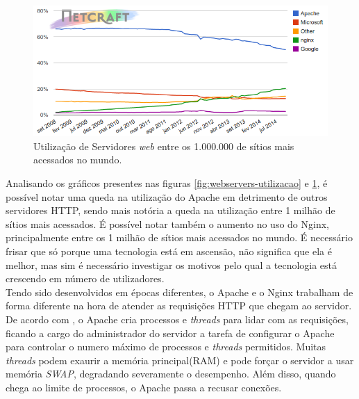 \begin{figure}[htb]
	\centering
	\includegraphics[width=1\linewidth]{figuras/grafico2} 
	\caption{Utilização de Servidores \textit{web} entre os 1.000.000 de sítios 
	mais acessados no mundo.}
	\label{fig:webservers-utilizacao-milhao}
\end{figure}
Analisando os gráficos presentes nas figuras \ref{fig:webservers-utilizacao} e 
\ref{fig:webservers-utilizacao-milhao}, é possível notar uma queda na 
utilização do Apache em detrimento de outros servidores HTTP, sendo mais 
notória a queda na utilização entre 1 milhão de sítios mais acessados. É 
possível notar também o aumento no uso do Nginx, principalmente entre os 1 
milhão de sítios mais acessados no mundo. É necessário frisar que só porque uma 
tecnologia está em ascensão, não significa que ela é melhor, mas sim é 
necessário investigar os motivos pelo qual a tecnologia está crescendo em 
número de utilizadores.\\
Tendo sido desenvolvidos em épocas diferentes, o Apache e o Nginx trabalham de 
forma diferente na hora de atender as requisições HTTP que chegam ao servidor.\\
De acordo com , o Apache cria processos e \textit{threads} 
para lidar com as requisições, ficando a cargo do administrador do servidor a 
tarefa de configurar o Apache para controlar o numero máximo de processos e 
\textit{threads} permitidos. Muitas \textit{threads} podem exaurir a memória 
principal(RAM) e pode forçar o servidor a usar memória \textit{SWAP}, 
degradando severamente o desempenho. Além disso, quando chega ao limite de 
processos, o Apache passa a recusar conexões.
